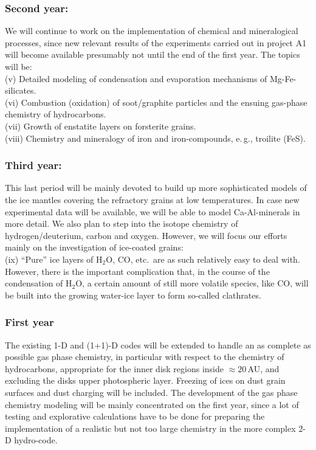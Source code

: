 %
\subsubsection{Second year:}
We will continue to work on the implementation of chemical and
mineralogical processes, since new relevant results of the
experiments carried out in project A1 will become available
presumably not until the end of the first year. The topics will
be:\\
%
(v) Detailed modeling of condensation and evaporation mechanisms
of Mg-Fe-silicates.\\
%
(vi) Combustion (oxidation) of soot/graphite particles and the
ensuing gas-phase chemistry of hydrocarbons.\\
%
(vii) Growth of enstatite layers on forsterite grains.
\\
(viii) Chemistry and mineralogy of iron and iron-compounds,
e.\,g., troilite (FeS).

\subsubsection{Third year:}
This last period will be mainly devoted to build up more
sophisticated models of the ice mantles covering the refractory
grains at low temperatures. In case new experimental data will be
available, we will be able to model Ca-Al-minerals in more detail.
We also plan to step into the isotope chemistry of
hydrogen/deuterium, carbon and oxygen. However, we will focus our
efforts mainly on the investigation of ice-coated grains:
\\
(ix) ``Pure'' ice layers of H$_2$O, CO, etc.\ are as such
relatively easy to deal with. However, there is the important
complication that, in the course of the condensation of H$_2$O, a
certain amount of still more volatile species, like CO, will be
built into the growing water-ice layer to form so-called
clathrates.

\bigskip
\medskip{}

\subsubsection{First year}
The existing 1-D and (1+1)-D codes will be extended to handle an
as complete as possible gas phase chemistry, in particular with
respect to the chemistry of hydrocarbons, appropriate for the
inner disk regions inside $\approx20$\,AU, and excluding the disks
upper photospheric layer. Freezing of ices on dust grain surfaces
and dust charging will be included. The development of the gas
phase chemistry modeling will be mainly concentrated on the first
year, since a lot of testing and explorative calculations have to
be done for preparing the implementation of a realistic but not
too large chemistry in the more complex 2-D hydro-code.

